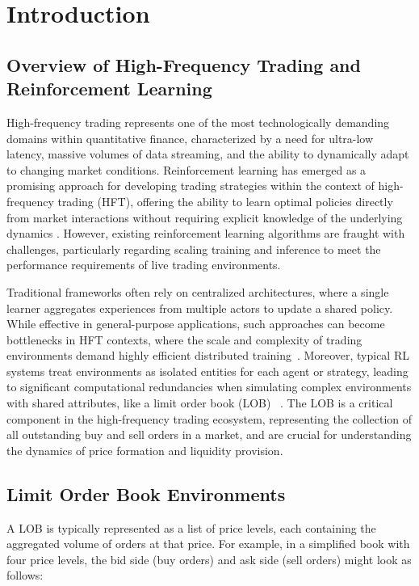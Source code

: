 \section{Introduction}
\label{sec:introduction}

\subsection{Overview of High-Frequency Trading and Reinforcement Learning}
High-frequency trading represents one of the most technologically demanding domains within quantitative finance,
characterized by a need for ultra-low latency, massive volumes of data streaming, and the ability to dynamically adapt to changing market conditions.
Reinforcement learning has emerged as a promising approach for developing trading strategies within the context of high-frequency trading (HFT),
offering the ability to learn optimal policies directly from market interactions without requiring explicit knowledge of the underlying dynamics
\cite{cartea2015algorithmic}.
However, existing reinforcement learning algorithms are fraught with challenges,
particularly regarding scaling training and inference to meet the performance requirements of live trading environments.

Traditional frameworks often rely on centralized architectures, where a single learner aggregates experiences from multiple actors to update a shared policy.
While effective in general-purpose applications, such approaches can become bottlenecks in HFT contexts,
where the scale and complexity of trading environments demand highly efficient distributed training~\cite{abernethy2013adaptive}.
Moreover, typical RL systems treat environments as isolated entities for each agent or strategy,
leading to significant computational redundancies when simulating complex environments with shared attributes, like a limit order book (LOB)
~\cite{cont2010stochastic}.
The LOB is a critical component in the high-frequency trading ecosystem, representing the collection of all outstanding buy and sell orders in a market,
and are crucial for understanding the dynamics of price formation and liquidity provision.

\subsection{Limit Order Book Environments}
A LOB is typically represented as a list of price levels, each containing the aggregated volume of orders at that price.
For example, in a simplified book with four price levels, the bid side (buy orders) and ask side (sell orders) might look as follows:

